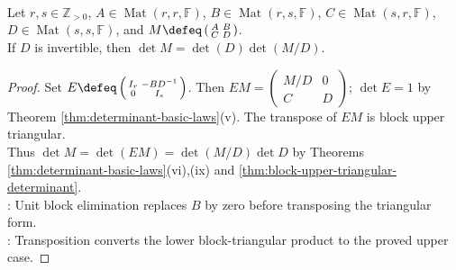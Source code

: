 \begin{proposition} \label{prop:schur-complement-lower-right-determinant} \\
Let $r,s\in\mathbb{Z}_{>0}$, $A\in\operatorname{Mat}(r,r,\mathbb{F})$, $B\in\operatorname{Mat}(r,s,\mathbb{F})$, $C\in\operatorname{Mat}(s,r,\mathbb{F})$, $D\in\operatorname{Mat}(s,s,\mathbb{F})$, and $M\defeq\left(\begin{smallmatrix}A&B\\C&D\end{smallmatrix}\right)$.\\
If $D$ is invertible, then $\det M=\det(D)\det(M/D)$.
\begin{proof}
Set $E\defeq\left(\begin{smallmatrix}I_r&-BD^{-1}\\0&I_s\end{smallmatrix}\right)$. Then $EM=\left(\begin{smallmatrix}M/D&0\\C&D\end{smallmatrix}\right)$; $\det E=1$ by Theorem \ref{thm:determinant-basic-laws}(v). The transpose of $EM$ is block upper triangular.\\
Thus $\det M=\det(EM)=\det(M/D)\det D$ by Theorems \ref{thm:determinant-basic-laws}(vi),(ix) and \ref{thm:block-upper-triangular-determinant}.\\
: Unit block elimination replaces $B$ by zero before transposing the triangular form.\\
: Transposition converts the lower block-triangular product to the proved upper case.
\end{proof}
\end{proposition}

